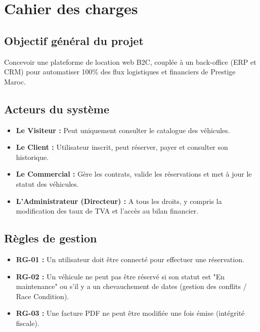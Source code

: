 \documentclass[12pt, a4paper]{report}
\begin{document}
\chapter{Cahier des charges}

\section{Objectif général du projet}
Concevoir une plateforme de location web B2C, couplée à un back-office (ERP et CRM) pour automatiser 100\% des flux logistiques et financiers de Prestige Maroc.

\section{Acteurs du système}
\begin{itemize}
    \item \textbf{Le Visiteur :} Peut uniquement consulter le catalogue des véhicules.
    \item \textbf{Le Client :} Utilisateur inscrit, peut réserver, payer et consulter son historique.
    \item \textbf{Le Commercial :} Gère les contrats, valide les réservations et met à jour le statut des véhicules.
    \item \textbf{L'Administrateur (Directeur) :} A tous les droits, y compris la modification des taux de TVA et l'accès au bilan financier.
\end{itemize}

\section{Règles de gestion}
\begin{itemize}
    \item \textbf{RG-01 :} Un utilisateur doit être connecté pour effectuer une réservation.
    \item \textbf{RG-02 :} Un véhicule ne peut pas être réservé si son statut est "En maintenance" ou s'il y a un chevauchement de dates (gestion des conflits / Race Condition).
    \item \textbf{RG-03 :} Une facture PDF ne peut être modifiée une fois émise (intégrité fiscale).
\end{itemize}
\end{document}
